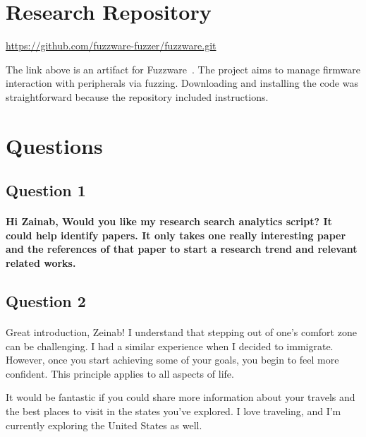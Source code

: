 \section{Research Repository}  \label{sec-research-repository}

\url{https://github.com/fuzzware-fuzzer/fuzzware.git}

The link above is an artifact for  Fuzzware~\cite{scharnowski2022fuzzware}. The project aims to manage firmware interaction with peripherals via fuzzing. Downloading and installing the code was straightforward because the repository included instructions.






\section{Questions}
\subsection{Question 1}
\paragraph{Hi Zainab, Would you like my research search analytics script? It could help identify papers. It only takes one really interesting paper and the references of that paper to start a research trend and relevant related works.}
\subsection{Question 2}
\paragraph{}

%
Great introduction, Zeinab! I understand that stepping out of one's comfort zone can be challenging. I had a similar experience when I decided to immigrate. However, once you start achieving some of your goals, you begin to feel more confident. This principle applies to all aspects of life.

It would be fantastic if you could share more information about your travels and the best places to visit in the states you've explored. I love traveling, and I'm currently exploring the United States as well.
